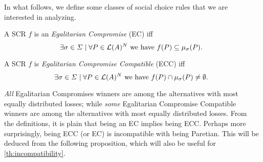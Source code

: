 \documentclass[version=3.21, pagesize, twoside=off, bibliography=totoc, DIV=calc, fontsize=12pt, a4paper]{scrartcl}
\begin{document}

In what follows, we define some classes of social choice rules that we are interested in analyzing. 


\begin{definition} A SCR $f$ is an \emph{Egalitarian Compromise} (EC) iff \[\exists \sigma \in \Sigma \suchthat \forall P \in \linors^N \text{ we have }f(P) \subseteq \musigma(P).\]
\end{definition}

\begin{definition} A SCR $f$ is \emph{Egalitarian Compromise Compatible} (ECC) iff \[\exists \sigma \in \Sigma \suchthat \forall P \in \linors^N \text{ we have } f(P) \cap \musigma(P) \neq \emptyset.\]
\end{definition}

\emph{All} Egalitarian Compromises winners are among the alternatives with most equally distributed losses; while \emph{some} Egalitarian Compromise Compatible winners are among the alternatives with most equally distributed losses.
From the definitions, it is plain that being an EC implies being ECC. Perhaps more surprisingly, being ECC (or EC) is incompatible with being Paretian. This will be deduced from the following proposition, which will also be useful for \cref{th:incompatibility}.
\end{document}

